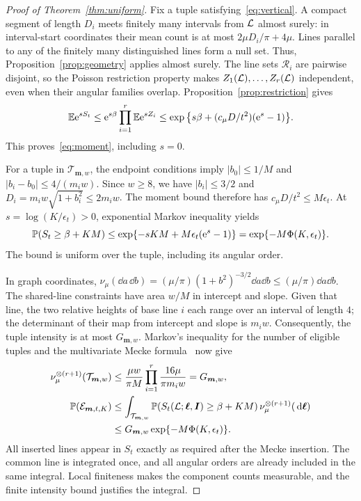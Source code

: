 \documentclass[11pt,letterpaper]{article}
\begin{document}
\begin{proof}[Proof of Theorem~\ref{thm:uniform}]
Fix a tuple satisfying~\eqref{eq:vertical}. A compact segment of length $D_i$ meets finitely many intervals from $\mathcal L$ almost surely: in interval-start coordinates their mean count is at most $2\mu D_i/\pi+4\mu$. Lines parallel to any of the finitely many distinguished lines form a null set. Thus, Proposition~\ref{prop:geometry} applies almost surely. The line sets $\mathscr R_i$ are pairwise disjoint, so the Poisson restriction property makes $Z_1(\mathcal L),\ldots,Z_r(\mathcal L)$ independent, even when their angular families overlap. Proposition~\ref{prop:restriction} gives
\begin{equation}\label{eq:independent}
 \mathbb E\mathrm{e}^{sS_t}
 \le\mathrm{e}^{s\beta}\prod_{i=1}^r\mathbb E\mathrm{e}^{sZ_i}
 \le\exp\big\{s\beta+(c_\mu D/t^2)(\mathrm{e}^s-1)\big\}.
\end{equation}
This proves~\eqref{eq:moment}, including $s=0$.

For a tuple in $\mathcal T_{\boldsymbol m,w}$, the endpoint conditions imply $|b_0|\le1/M$ and $|b_i-b_0|\le4/(m_iw)$. Since $w\ge8$, we have $|b_i|\le3/2$ and $D_i=m_iw\sqrt{1+b_i^2}\le2m_iw$. The moment bound therefore has $c_\mu D/t^2\le M\epsilon_t$. At $s=\log(K/\epsilon_t)>0$, exponential Markov inequality yields
\begin{equation}\label{eq:tail}
 \mathbb P(S_t\ge\beta+KM)
 \le\exp\{-sKM+M\epsilon_t(\mathrm{e}^s-1)\}
 =\exp\{-M\Phi(K,\epsilon_t)\}.
\end{equation}
The bound is uniform over the tuple, including its angular order.

In graph coordinates, $\nu_\mu(\dd a\,\dd b)=(\mu/\pi)(1+b^2)^{-3/2}\dd a\dd b\le(\mu/\pi)\dd a\dd b$. The shared-line constraints have area $w/M$ in intercept and slope. Given that line, the two relative heights of base line $i$ each range over an interval of length $4$; the determinant of their map from intercept and slope is $m_iw$. Consequently, the tuple intensity is at most $G_{\boldsymbol m,w}$. Markov's inequality for the number of eligible tuples and the multivariate Mecke formula~\cite[Theorem~4.4]{LP17} now give
\begin{equation}\label{eq:mecke}
\begin{aligned}
 \nu_\mu^{\otimes(r+1)}(\mathcal T_{\boldsymbol m,w})
 &\le\frac{\mu w}{\pi M}\prod_{i=1}^r\frac{16\mu}{\pi m_iw}
   =G_{\boldsymbol m,w},\\
 \mathbb P(\mathcal E_{\boldsymbol m,t,K})
 &\le\int_{\mathcal T_{\boldsymbol m,w}}
       \mathbb P(S_t(\mathcal L;\boldsymbol\ell,\boldsymbol I)\ge\beta+KM)
                  \,\nu_\mu^{\otimes(r+1)}(\,\mathrm{d}\boldsymbol\ell)\\
 &\le G_{\boldsymbol m,w}\exp\{-M\Phi(K,\epsilon_t)\}.
\end{aligned}
\end{equation}
All inserted lines appear in $S_t$ exactly as required after the Mecke insertion. The common line is integrated once, and all angular orders are already included in the same integral. Local finiteness makes the component counts measurable, and the finite intensity bound justifies the integral.
\end{proof}
\end{document}
